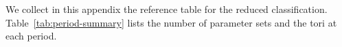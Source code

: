 We collect in this appendix the reference table for the reduced
classification. Table~\ref{tab:period-summary} lists the number
of parameter sets and the tori at each period.
